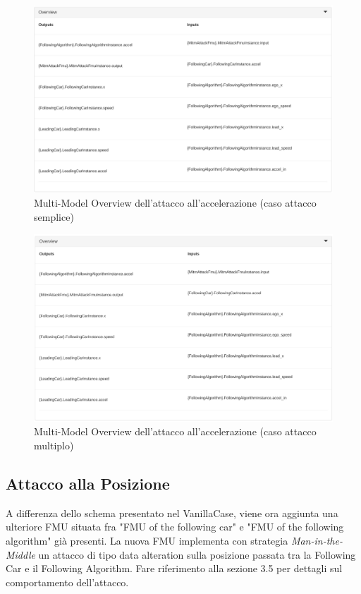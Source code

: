 \begin{figure}[H]
	\centering
	\includegraphics[width=\textwidth]{img/OverviewAccelSingle.png}
	\caption{Multi-Model Overview dell'attacco all'accelerazione (caso attacco semplice)}
\end{figure}
\begin{figure}[H]
	\centering
	\includegraphics[width=\textwidth]{img/OverviewAccelMulti.png}
	\caption{Multi-Model Overview dell'attacco all'accelerazione (caso attacco multiplo)}
\end{figure}

\subsection{Attacco alla Posizione }
A differenza dello schema presentato nel VanillaCase, viene ora aggiunta una ulteriore FMU situata fra "FMU of the following car" e "FMU of the following algorithm" già presenti. La nuova FMU implementa con strategia \textit{Man-in-the-Middle} un attacco di tipo data alteration sulla posizione passata tra la Following Car e il Following Algorithm. Fare riferimento alla sezione 3.5 per dettagli sul comportamento dell'attacco.

